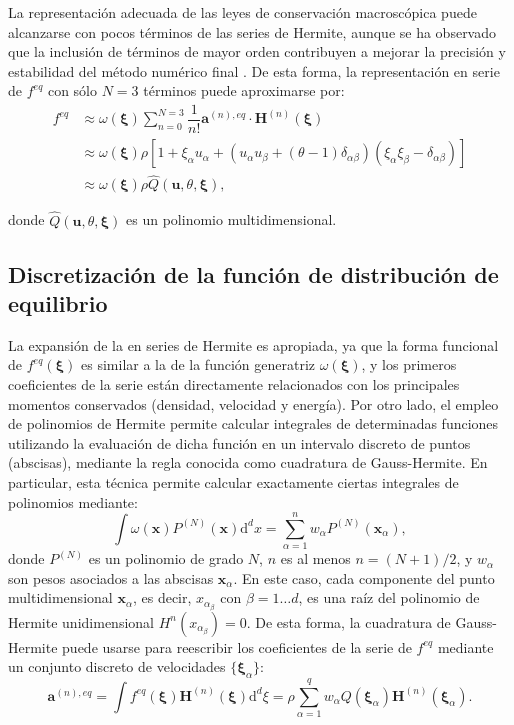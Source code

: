 La representaci\'on adecuada de las leyes de conservaci\'on macrosc\'opica puede alcanzarse con pocos t\'erminos de las series de Hermite, aunque se ha observado que la inclusi\'on de t\'erminos de mayor orden contribuyen a mejorar la precisi\'on y estabilidad del m\'etodo num\'erico final \cite{dhumieres_multiple-relaxation-time_2002}. De esta forma, la representaci\'on en serie de $f^{eq}$ con s\'olo $N=3$ t\'erminos puede aproximarse por:
\begin{equation}
\begin{aligned}
	f^{eq} &\approx \omega(\bm{\xi}) \sum_{n=0}^{N=3} \dfrac{1}{n!}\bm{a}^{(n),eq} \cdot \bm{H}^{(n)}(\bm{\xi}) \\
	&\approx \omega(\bm{\xi}) \rho \left[ 1 + \xi_{\alpha}u_{\alpha} + \left( u_{\alpha}u_{\beta}+(\theta-1)\delta_{\alpha\beta} \right)\left(\xi_{\alpha}\xi_{\beta} - \delta_{\alpha\beta}\right) \right] \\
	&\approx \omega(\bm{\xi}) \rho \hat{Q}(\bm{u}, \theta, \bm{\xi}),
\end{aligned}
\end{equation}

donde $\hat{Q}(\bm{u}, \theta, \bm{\xi})$ es un polinomio multidimensional.



\subsection{Discretizaci\'on de la funci\'on de distribuci\'on de equilibrio}

La expansi\'on de la \edf{} \feqvar{} en series de Hermite es apropiada, ya que la forma funcional de $f^{eq}(\bm{\xi})$ es similar a la de la funci\'on generatriz $\omega(\bm{\xi})$, y los primeros coeficientes de la serie est\'an directamente relacionados con los principales momentos conservados (densidad, velocidad y energ\'ia). Por otro lado, el empleo de polinomios de Hermite permite calcular integrales de determinadas funciones utilizando la evaluaci\'on de dicha funci\'on en un intervalo discreto de puntos (abscisas), mediante la regla conocida como cuadratura de Gauss-Hermite. En particular, esta t\'ecnica permite calcular exactamente ciertas integrales de polinomios mediante:
\begin{equation}
	\int \omega(\bm{x}) P^{(N)}(\bm{x})\mbox{d}^dx = \sum_{\alpha=1}^{n} w_{\alpha} P^{(N)}(\bm{x}_{\alpha}),
\end{equation}
donde $P^{(N)}$ es un polinomio de grado $N$, $n$ es al menos $n=(N+1)/2$, y $w_{\alpha}$ son pesos asociados a las abscisas $\bm{x}_{\alpha}$. En este caso, cada componente del punto multidimensional $\bm{x}_{\alpha}$, es decir, $x_{\alpha_{\beta}}$ con $\beta=1\ldots d$, es una ra\'iz del polinomio de Hermite unidimensional $H^{n}(x_{\alpha _{\beta}})=0$. De esta forma, la cuadratura de Gauss-Hermite puede usarse para reescribir los coeficientes de la serie de $f^{eq}$ mediante un conjunto discreto de velocidades $\{ \bm{\xi}_{\alpha} \}$:
\begin{equation}
	\bm{a}^{(n),eq} = \int f^{eq}(\bm{\xi}) \bm{H}^{(n)}(\bm{\xi}) \mbox{d}^d \xi 
	= \rho \sum_{\alpha=1}^q w_{\alpha} Q(\bm{\xi}_{\alpha})\bm{H}^{(n)}(\bm{\xi}_{\alpha}).
\end{equation}

